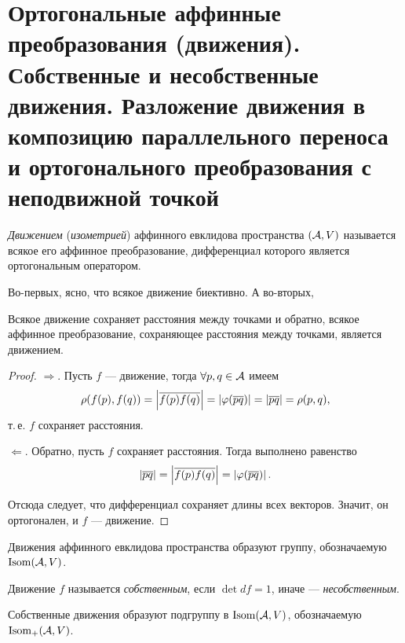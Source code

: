 \section{Ортогональные аффинные преобразования (движения). Собственные и несобственные движения. Разложение движения в композицию параллельного переноса и ортогонального преобразования с неподвижной точкой}

\begin{definition}
    \textit{Движением} (\textit{изометрией}) аффинного евклидова пространства $(\mathcal{A}, V)$ называется всякое его аффинное преобразование, дифференциал которого является ортогональным оператором.
\end{definition}

Во-первых, ясно, что всякое движение биективно. А во-вторых,

\begin{theorem}
    Всякое движение сохраняет расстояния между точками и обратно, всякое аффинное преобразование, сохраняющее расстояния между точками, является движением.
\end{theorem}

\begin{proof}
    $\Rightarrow$. Пусть $f$ --- движение, тогда $\forall p, q \in \mathcal{A}$ имеем
    \[
        \rho(f(p), f(q)) = \left\lvert\overline{f(p)f(q)}\right\rvert = \left\lvert\varphi(\overline{pq})\right\rvert = \left\lvert\overline{pq}\right\rvert = \rho(p, q),
    \]
    т.\,е. $f$ сохраняет расстояния.

    $\Leftarrow$. Обратно, пусть $f$ сохраняет расстояния. Тогда выполнено равенство
    \[
        \left\lvert\overline{pq}\right\rvert = \left\lvert\overline{f(p)f(q)}\right\rvert = \left\lvert\varphi(\overline{pq})\right\rvert.
    \]

    Отсюда следует, что дифференциал сохраняет длины всех векторов. Значит, он ортогонален, и $f$ --- движение.
\end{proof}

Движения аффинного евклидова пространства образуют группу, обозначаемую $\mathrm{Isom}(\mathcal{A}, V)$.

\begin{definition}
    Движение $f$ называется \textit{собственным}, если $\det df = 1$, иначе --- \textit{несобственным}.
\end{definition}

Собственные движения образуют подгруппу в $\mathrm{Isom}(\mathcal{A}, V)$, обозначаемую $\mathrm{Isom}_+(\mathcal{A}, V)$.

